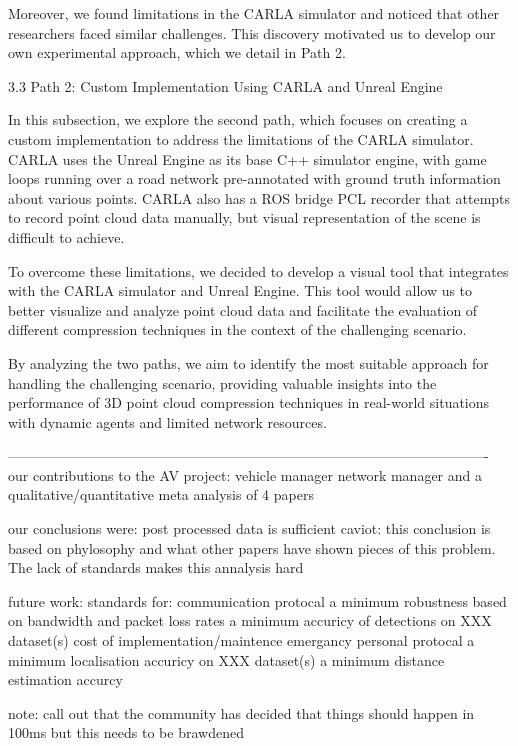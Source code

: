 \documentclass[conference]{IEEEtran}
\begin{document}
Moreover, we found limitations in the CARLA simulator and noticed that other researchers faced similar challenges. This discovery motivated us to develop our own experimental approach, which we detail in Path 2.

3.3 Path 2: Custom Implementation Using CARLA and Unreal Engine

In this subsection, we explore the second path, which focuses on creating a custom implementation to address the limitations of the CARLA simulator. CARLA uses the Unreal Engine as its base C++ simulator engine, with game loops running over a road network pre-annotated with ground truth information about various points. CARLA also has a ROS bridge PCL recorder that attempts to record point cloud data manually, but visual representation of the scene is difficult to achieve.

To overcome these limitations, we decided to develop a visual tool that integrates with the CARLA simulator and Unreal Engine. This tool would allow us to better visualize and analyze point cloud data and facilitate the evaluation of different compression techniques in the context of the challenging scenario.

By analyzing the two paths, we aim to identify the most suitable approach for handling the challenging scenario, providing valuable insights into the performance of 3D point cloud compression techniques in real-world situations with dynamic agents and limited network resources.



-------------------------------------------------------------------------------------------------------
our contributions to the AV project:
vehicle manager
network manager
and a qualitative/quantitative meta analysis of 4 papers

our conclusions were:
post processed data is sufficient
caviot: this conclusion is based on phylosophy and what other papers have shown pieces of    this problem.
The lack of standards makes this annalysis hard

future work:
standards for:
communication protocal
a minimum robustness based on bandwidth and packet loss rates
a minimum accuricy of detections on XXX dataset(s)
cost of implementation/maintence
emergancy personal protocal
a minimum localisation accuricy on XXX dataset(s)
a minimum distance estimation accurcy

note: call out that the community has decided that things should happen in 100ms but this       needs to be brawdened
\end{document}

